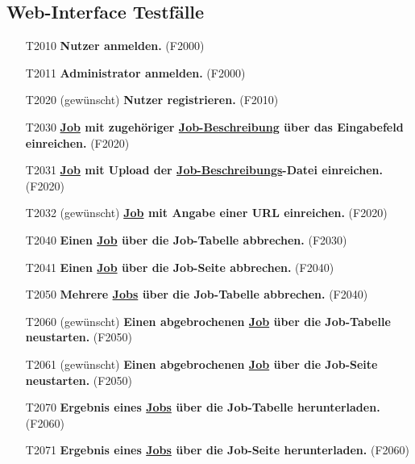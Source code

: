 \subsection{\gls{Web-Interface} Testfälle}

\begin{itemize}
    \item[T2010] \textbf{\gls{Nutzer} anmelden.} (F2000)
    
    \item[T2011] \textbf{\gls{Administrator} anmelden.} (F2000)
    
    \item[T2020] (gewünscht) \textbf{\gls{Nutzer} registrieren.} (F2010)
    
    \item[T2030] \textbf{\hyperref[B:Jobs]{Job} mit zugehöriger \hyperref[B:Job-Beschreibung]{Job-Beschreibung} über das Eingabefeld einreichen.} (F2020)
    
    \item[T2031] \textbf{\hyperref[B:Jobs]{Job} mit Upload der \hyperref[B:Job-Beschreibung]{Job-Beschreibungs}-Datei einreichen.} (F2020)
    
    \item[T2032] (gewünscht) \textbf{\hyperref[B:Jobs]{Job} mit Angabe einer \gls{URL} einreichen.} (F2020)
    
    \item[T2040] \textbf{Einen \hyperref[B:Jobs]{Job} über die Job-Tabelle abbrechen.} (F2030)
    
    \item[T2041] \textbf{Einen \hyperref[B:Jobs]{Job} über die Job-Seite abbrechen.} (F2040)
    
    \item[T2050] \textbf{Mehrere \hyperref[B:Jobs]{Jobs} über die Job-Tabelle abbrechen.} (F2040)
    
    \item[T2060] (gewünscht) \textbf{Einen abgebrochenen \hyperref[B:Jobs]{Job} über die Job-Tabelle neustarten.} (F2050)
    
    \item[T2061] (gewünscht) \textbf{Einen abgebrochenen \hyperref[B:Jobs]{Job} über die Job-Seite neustarten.} (F2050)
    
    \item[T2070] \textbf{Ergebnis eines \hyperref[B:Jobs]{Jobs} über die Job-Tabelle herunterladen.} (F2060)
    
    \item[T2071] \textbf{Ergebnis eines \hyperref[B:Jobs]{Jobs} über die Job-Seite herunterladen.} (F2060)
    

\end{itemize}

